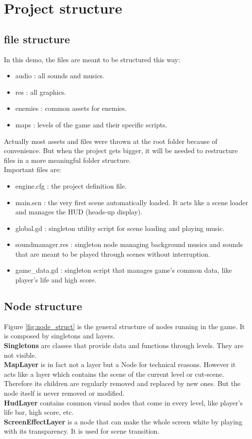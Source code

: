 \documentclass[10pt,a4paper]{article}
\begin{document}
\section{Project structure}

\subsection{file structure}
In this demo, the files are meant to be structured this way:
\begin{itemize}
 \item audio : all sounds and musics.
 \item res : all graphics.
 \item enemies : common assets for enemies.
 \item maps : levels of the game and their specific scripts.
\end{itemize}
Actually most assets and files were thrown at the root folder because of convenience. But when the project gets bigger, it will be needed to restructure files in a more meaningful folder structure. \\
Important files are:
\begin{itemize}
 \item engine.cfg : the project definition file.
 \item main.scn : the very first scene automatically loaded. It acts like a scene loader and manages the HUD (heads-up display).
 \item global.gd : singleton utility script for scene loading and playing music.
 \item soundmanager.res : singleton node managing background musics and sounds that are meant to be played through scenes without interruption.
 \item game\_data.gd : singleton script that manages game's common data, like player's life and high score.
\end{itemize}
\subsection{Node structure}
Figure \ref{fig:node_struct} is the general structure of nodes running in the game.
It is composed by singletons and layers. \\
\textbf{Singletons} are classes that provide data and functions through levels. They are not visible. \\
\textbf{MapLayer} is in fact not a layer but a Node for technical reasons. However it acts like a layer which contains the scene of the current level or cut-scene. Therefore its children are regularly removed and replaced by new ones. But the node itself is never removed or modified. \\
\textbf{HudLayer} contains common visual nodes that come in every level, like player's life bar, high score, etc. \\
\textbf{ScreenEffectLayer} is a node that can make the whole screen white by playing with its transparency. It is used for scene transition.
\end{document}
